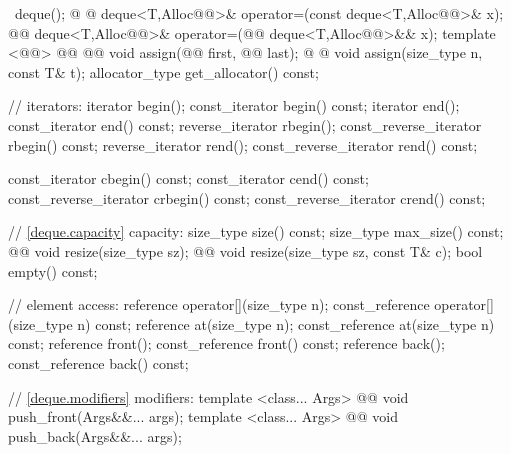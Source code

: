 \documentclass[american,twoside]{book}
\begin{document}
\begin{codeblock}
{{   ~deque();
    @ @
      deque<T,Alloc@@>& operator=(const deque<T,Alloc@@>& x);
    @@
      deque<T,Alloc@@>& operator=(@@ deque<T,Alloc@@>&& x);
    template <@@>
      @@
            @@
      void assign(@@ first, @@ last);
    @ @ 
      void assign(size_type n, const T& t);
    allocator_type get_allocator() const;

    // iterators:
    iterator               begin();
    const_iterator         begin() const;
    iterator               end();
    const_iterator         end() const;
    reverse_iterator       rbegin();
    const_reverse_iterator rbegin() const;
    reverse_iterator       rend();
    const_reverse_iterator rend() const;

    const_iterator         cbegin() const;
    const_iterator         cend() const;
    const_reverse_iterator crbegin() const;
    const_reverse_iterator crend() const;

    // \ref{deque.capacity} capacity:
    size_type size() const;
    size_type max_size() const;
    @@ 
      void resize(size_type sz);
    @@
      void resize(size_type sz, const T& c);
    bool empty() const;

    // element access:
    reference       operator[](size_type n);
    const_reference operator[](size_type n) const;
    reference       at(size_type n);
    const_reference at(size_type n) const;
    reference       front();
    const_reference front() const;
    reference       back();
    const_reference back() const;

    // \ref{deque.modifiers} modifiers:
    template <class... Args> 
      @@ 
      void push_front(Args&&... args);
    template <class... Args> 
      @@ 
      void push_back(Args&&... args);

}}
\end{codeblock}
\end{document}
